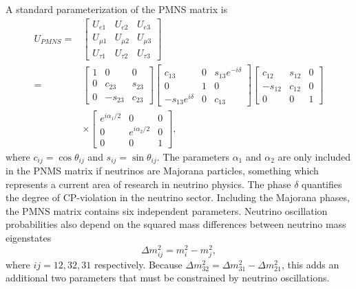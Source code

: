 A standard parameterization \cite{Workman:2022ynf} of the PMNS matrix is 
\begin{equation}
    \begin{split}
        U_{PMNS}=&\begin{bmatrix}
            U_{e1}&U_{e2}&U_{e3}\\
            U_{\mu 1}&U_{\mu 2}&U_{\mu 3}\\
            U_{\tau 1}&U_{\tau 2}&U_{\tau 3}
        \end{bmatrix}\\
        =&\begin{bmatrix}
            1&0&0\\0&c_{23}&s_{23}\\0&-s_{23}&c_{23}
        \end{bmatrix}
        \begin{bmatrix}
            c_{13}&0&s_{13}e^{-i\delta}\\0&1&0\\-s_{13}e^{i\delta}&0&c_{13}
        \end{bmatrix}
        \begin{bmatrix}
            c_{12}&s_{12}&0\\-s_{12}&c_{12}&0\\0&0&1
        \end{bmatrix}\\
        &\times
        \begin{bmatrix}
            e^{i\alpha_1/2}&0&0\\
            0&e^{i\alpha_2/2}&0\\
            0&0&1
        \end{bmatrix},
    \end{split}
\end{equation}
where $c_{ij}=\cos{\theta_{ij}}$ and $s_{ij}=\sin{\theta_{ij}}$. The parameters $\alpha_1$ and $\alpha_2$ are only included in the PNMS matrix if neutrinos are Majorana particles, something which represents a current area of research in neutrino physics. The phase $\delta$ quantifies the degree of CP-violation in the neutrino sector. Including the Majorana phases, the PMNS matrix contains six independent parameters. Neutrino oscillation probabilities also depend on the squared mass differences between neutrino mass eigenstates
\begin{equation}
    \Delta m_{ij}^2=m_i^2-m_j^2,
\end{equation}
where $ij=12,32,31$ respectively. Because $\Delta m_{32}^2=\Delta m_{31}^2-\Delta m_{21}^2$, this adds an additional two parameters that must be constrained by neutrino oscillations. 

